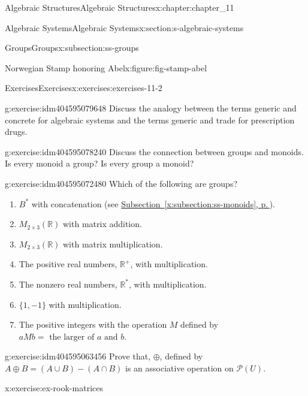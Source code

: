 \documentclass[twoside,10pt,]{book}
\newcommand{\xreffont}{\relax}
\numberwithin{equation}{section}
\begin{document}
\begin{chapterptx}{Algebraic Structures}{}{Algebraic Structures}{}{}{x:chapter:chapter_11}
\begin{sectionptx}{Algebraic Systems}{}{Algebraic Systems}{}{}{x:section:s-algebraic-systems}
\begin{subsectionptx}{Groups}{}{Groups}{}{}{x:subsection:ss-groups}
\begin{figureptx}{Norwegian Stamp honoring Abel}{x:figure:fig-stamp-abel}{}
\tcblower
\end{figureptx}%
\end{subsectionptx}
%
%
\typeout{************************************************}
\typeout{************************************************}
%
\begin{exercises-subsection}{Exercises}{}{Exercises}{}{}{x:exercises:exercises-11-2}
\begin{divisionexercise}{1}{}{}{g:exercise:idm404595079648}%
Discuss the analogy between the terms generic and concrete for algebraic systems and the terms generic and trade for prescription drugs.%
\end{divisionexercise}%
\begin{divisionexercise}{2}{}{}{g:exercise:idm404595078240}%
Discuss the connection between groups and monoids. Is every monoid a group? Is every group a monoid?%
\end{divisionexercise}%
\begin{divisionexercise}{3}{}{}{g:exercise:idm404595072480}%
Which of the following are groups?%
\begin{enumerate}[label=(\alph*)]
\item{}\(B^*\) with concatenation (see \hyperref[x:subsection:ss-monoids]{Subsection~{\xreffont\ref{x:subsection:ss-monoids}}, p.\,\pageref{x:subsection:ss-monoids}}).%
\item{}\(M_{2\times 3}(\mathbb{R})\) with matrix addition.%
\item{}\(M_{2\times 3}(\mathbb{R})\) with matrix multiplication.%
\item{}The positive real numbers, \(\mathbb{R}^+\), with multiplication.%
\item{}The nonzero real numbers, \(\mathbb{R}^*\), with multiplication.%
\item{}\(\{1, -1\}\) with multiplication.%
\item{}The positive integers with the operation \(M\) defined by \(a M b = \textrm{ the larger of } a \textrm{ and } b\).%
\end{enumerate}
%
\end{divisionexercise}%
\begin{divisionexercise}{4}{}{}{g:exercise:idm404595063456}%
Prove that, \(\oplus\), defined by \(A \oplus  B = (A \cup  B) - (A \cap  B)\) is an associative operation on \(\mathcal{P}(U)\).%
\end{divisionexercise}%
\begin{divisionexercise}{5}{}{}{x:exercise:ex-rook-matrices}%

\end{divisionexercise}
\end{exercises-subsection}
\end{sectionptx}
\end{chapterptx}
\end{document}
